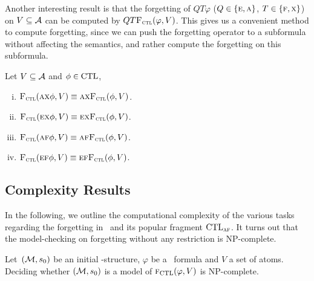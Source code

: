 \documentclass[letterpaper]{article} %
\begin{document}
Another interesting result is that the forgetting of $Q T \varphi$ ($Q\in \{\textsc{e}, \textsc{a}\}$, $T \in \{\textsc{f}, \textsc{x}\}$) on $V\subseteq {\cal A}$ can be computed by $QT {\textsc{F}_{\textsc{ctl}}}(\varphi, V)$. This gives us a convenient method to compute forgetting, since we can push the forgetting operator to a subformula without affecting the semantics, and rather compute the forgetting on this subformula.
\begin{proposition}[Homogeneity]\label{pro:ctl:forget:2}
  Let $V\subseteq\cal A$ and $\phi \in \textrm{CTL}$,%
  \begin{enumerate}[(i)]
    \item ${\textsc{F}_{\textsc{ctl}}}(\textsc{a}\textsc{x}\phi,V)\equiv \textsc{a}\textsc{x} {\textsc{F}_{\textsc{ctl}}}(\phi,V)$.
    \item ${\textsc{F}_{\textsc{ctl}}}(\textsc{e}\textsc{x}\phi,V)\equiv\textsc{e}\textsc{x} {\textsc{F}_{\textsc{ctl}}}(\phi,V)$.
    \item ${\textsc{F}_{\textsc{ctl}}}(\textsc{a} \textsc{f}\phi,V)\equiv \textsc{a} \textsc{f} {\textsc{F}_{\textsc{ctl}}}(\phi,V)$.
    \item ${\textsc{F}_{\textsc{ctl}}}(\textsc{e}\textsc{f}\phi,V)\equiv\textsc{e}\textsc{f} {\textsc{F}_{\textsc{ctl}}}(\phi,V)$.
  \end{enumerate}
\end{proposition}



\subsection{Complexity Results}
In the following, we outline the computational complexity of the various tasks regarding the forgetting in \CTL\ and its popular fragment $\textrm{CTL}_{\textsc{a}\textsc{f}}$.  It turns out that the model-checking on forgetting without any restriction is NP-complete.
\begin{proposition}\label{modelChecking}
Let~$({\cal M},s_0)$ be an initial \MPK-structure, $\varphi$ be a \CTL\ formula and $V$ a set of atoms. Deciding whether $({\cal M},s_0)$ is a model of ${\textsc{f}_{\textrm{CTL}}}(\varphi, V )$ is NP-complete.
\end{proposition}
\end{document}
